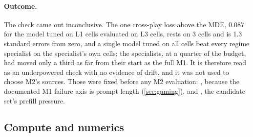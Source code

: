 \paragraph{Outcome.}
The check came out inconclusive. The one cross-play loss above the MDE, 0.087 for the model tuned
on L1 cells evaluated on L3 cells, rests on 3 cells and is 1.3 standard errors from zero, and a
single model tuned on all cells beat every regime specialist on the specialist's own cells; the
specialists, at a quarter of the budget, had moved only a third as far from their start as the full
M1. It is therefore read as an underpowered check with no evidence of drift, and it was not used to
choose M2's sources. Those were fixed before any M2 evaluation: , because the
documented M1 failure axis is prompt length (\cref{sec:gaming}), and
, the candidate set's prefill pressure.

\subsection{Compute and numerics}
\label{sec:compute}

